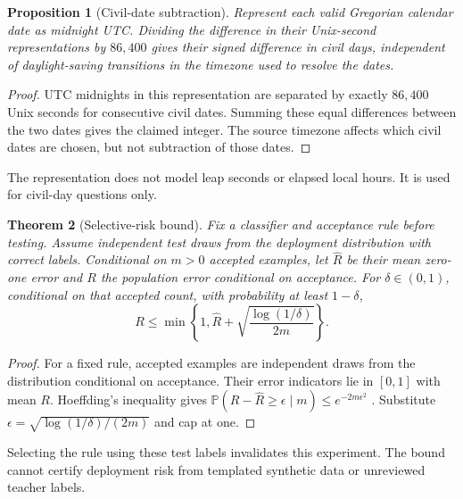 \documentclass[11pt]{article}
\newtheorem{theorem}{Theorem}
\newtheorem{proposition}[theorem]{Proposition}
\newcommand{\Prob}{\mathbb{P}}
\begin{document}
\begin{proposition}[Civil-date subtraction]
Represent each valid Gregorian calendar date as midnight UTC. Dividing the difference in their Unix-second representations by $86{,}400$ gives their signed difference in civil days, independent of daylight-saving transitions in the timezone used to resolve the dates.
\end{proposition}
\begin{proof}
UTC midnights in this representation are separated by exactly $86{,}400$ Unix seconds for consecutive civil dates. Summing these equal differences between the two dates gives the claimed integer. The source timezone affects which civil dates are chosen, but not subtraction of those dates.
\end{proof}
The representation does not model leap seconds or elapsed local hours. It is used for civil-day questions only.

\begin{theorem}[Selective-risk bound]
Fix a classifier and acceptance rule before testing. Assume independent test draws from the deployment distribution with correct labels. Conditional on $m>0$ accepted examples, let $\widehat R$ be their mean zero-one error and $R$ the population error conditional on acceptance. For $\delta\in(0,1)$, conditional on that accepted count, with probability at least $1-\delta$,
\[
 R\leq\min\left\{1,\widehat R+
 \sqrt{\frac{\log(1/\delta)}{2m}}\right\}.
\]
\end{theorem}
\begin{proof}
For a fixed rule, accepted examples are independent draws from the distribution conditional on acceptance. Their error indicators lie in $[0,1]$ with mean $R$. Hoeffding's inequality gives
$\Prob(R-\widehat R\geq\epsilon\mid m)\leq e^{-2m\epsilon^2}$ \citep{hoeffding}.
Substitute $\epsilon=\sqrt{\log(1/\delta)/(2m)}$ and cap at one.
\end{proof}
Selecting the rule using these test labels invalidates this experiment. The bound cannot certify deployment risk from templated synthetic data or unreviewed teacher labels.
\end{document}
